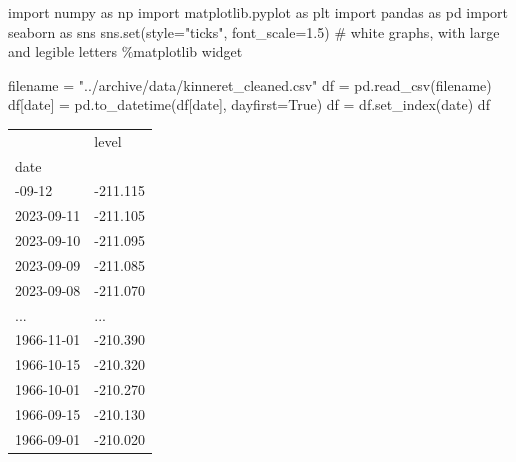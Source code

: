 \documentclass[
  letterpaper,
  DIV=11,
  numbers=noendperiod,
  oneside]{scrreprt}
\newenvironment{Shaded}{\begin{snugshade}}{\end{snugshade}}
\newcommand{\BuiltInTok}[1]{\textcolor[rgb]{0.00,0.23,0.31}{#1}}
\newcommand{\CommentTok}[1]{\textcolor[rgb]{0.37,0.37,0.37}{#1}}
\newcommand{\FloatTok}[1]{\textcolor[rgb]{0.68,0.00,0.00}{#1}}
\newcommand{\ImportTok}[1]{\textcolor[rgb]{0.00,0.46,0.62}{#1}}
\newcommand{\NormalTok}[1]{\textcolor[rgb]{0.00,0.23,0.31}{#1}}
\newcommand{\OperatorTok}[1]{\textcolor[rgb]{0.37,0.37,0.37}{#1}}
\newcommand{\StringTok}[1]{\textcolor[rgb]{0.13,0.47,0.30}{#1}}
\newcommand{\VariableTok}[1]{\textcolor[rgb]{0.07,0.07,0.07}{#1}}
\begin{document}
\begin{Shaded}
\begin{Highlighting}[]
\ImportTok{import}\NormalTok{ numpy }\ImportTok{as}\NormalTok{ np}
\ImportTok{import}\NormalTok{ matplotlib.pyplot }\ImportTok{as}\NormalTok{ plt}
\ImportTok{import}\NormalTok{ pandas }\ImportTok{as}\NormalTok{ pd}
\ImportTok{import}\NormalTok{ seaborn }\ImportTok{as}\NormalTok{ sns}
\NormalTok{sns.}\BuiltInTok{set}\NormalTok{(style}\OperatorTok{=}\StringTok{"ticks"}\NormalTok{, font\_scale}\OperatorTok{=}\FloatTok{1.5}\NormalTok{)  }\CommentTok{\# white graphs, with large and legible letters}
\OperatorTok{\%}\NormalTok{matplotlib widget}
\end{Highlighting}
\end{Shaded}

\begin{Shaded}
\begin{Highlighting}[]
\NormalTok{filename }\OperatorTok{=} \StringTok{"../archive/data/kinneret\_cleaned.csv"}
\NormalTok{df }\OperatorTok{=}\NormalTok{ pd.read\_csv(filename)}
\NormalTok{df[}\StringTok{\textquotesingle{}date\textquotesingle{}}\NormalTok{] }\OperatorTok{=}\NormalTok{ pd.to\_datetime(df[}\StringTok{\textquotesingle{}date\textquotesingle{}}\NormalTok{], dayfirst}\OperatorTok{=}\VariableTok{True}\NormalTok{)}
\NormalTok{df }\OperatorTok{=}\NormalTok{ df.set\_index(}\StringTok{\textquotesingle{}date\textquotesingle{}}\NormalTok{)}
\NormalTok{df}
\end{Highlighting}
\end{Shaded}

\begin{longtable}[]{@{}ll@{}}
\toprule\noalign{}
& level \\
date & \\
\midrule\noalign{}
\endhead
\bottomrule\noalign{}
\endlastfoot
2023-09-12 & -211.115 \\
2023-09-11 & -211.105 \\
2023-09-10 & -211.095 \\
2023-09-09 & -211.085 \\
2023-09-08 & -211.070 \\
... & ... \\
1966-11-01 & -210.390 \\
1966-10-15 & -210.320 \\
1966-10-01 & -210.270 \\
1966-09-15 & -210.130 \\
1966-09-01 & -210.020 \\
\end{longtable}
\end{document}
